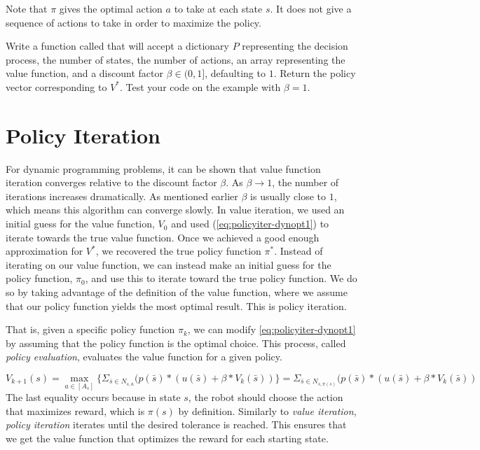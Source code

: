 \begin{info}
Note that $\pi$ gives the optimal action $a$ to take at each state $s$.
It does not give a sequence of actions to take in order to maximize the policy.
\end{info}

\begin{problem}
\label{prob:policyiter-value2}
Write a function called  that will accept a dictionary $P$ representing the decision process, the number of states, the number of actions, an array representing the value function, and a discount factor $\beta \in (0,1]$, defaulting to $1$.
Return the policy vector corresponding to $V^*$.
Test your code on the example with $\beta = 1$.
\end{problem}

\section*{Policy Iteration}
For dynamic programming problems, it can be shown that value function iteration converges relative to the discount factor $\beta$.
As $\beta\rightarrow1$, the number of iterations increases dramatically.
As mentioned earlier $\beta$ is usually close to $1$, which means this algorithm can converge slowly.
In value iteration, we used an initial guess for the value function, $V_0$ and used (\ref{eq:policyiter-dynopt1}) to iterate towards the true value function.
Once we achieved a good enough approximation for $V^*$, we recovered the true policy function $\pi^*$.
Instead of iterating on our value function, we can instead make an initial guess for the policy function, $\pi_0$, and use this to iterate toward the true policy function.
We do so by taking advantage of the definition of the value function, where we assume that our policy function yields the most optimal result.
This is policy iteration.

That is, given a specific policy function $\pi_k$, we can modify \eqref{eq:policyiter-dynopt1} by assuming that the policy function is the optimal choice.
This process, called \emph{policy evaluation}, evaluates the value function for a given policy.

\begin{equation}
\label{eq:policyiter-val_from_policy}
V_{k+1}(s) = \max_{a \in [A_s]} \{\Sigma_{\bar{s}\in N_{s,a}}(p(\bar{s})*(u(\bar{s}) + \beta *V_{k}(\bar{s}))\} =  \Sigma_{\bar{s}\in N_{s,\pi(s)}}(p(\bar{s})*(u(\bar{s}) + \beta *V_{k}(\bar{s}))
\end{equation}
The last equality occurs because in state $s$, the robot should choose the action that maximizes reward, which is $\pi(s)$ by definition.
Similarly to \emph{value iteration}, \emph{policy iteration} iterates until the desired tolerance is reached.
This ensures that we get the value function that optimizes the reward for each starting state.


